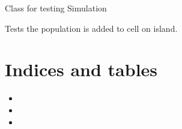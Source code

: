 \documentclass[a4paper,10pt,english]{sphinxmanual}
\begin{document}
\begin{fulllineitems}
\label{\detokenize{tests:biosim.tests.test_simulation.TestSimulation}}
Class for testing Simulation

\begin{fulllineitems}
\label{\detokenize{tests:biosim.tests.test_simulation.TestSimulation.test_add_population}}
Tests the population is added to cell on island.

\end{fulllineitems}


\end{fulllineitems}



\chapter{Indices and tables}
\label{\detokenize{index:indices-and-tables}}\begin{itemize}
\item {} 

\item {} 

\item {} 

\end{itemize}
\end{document}
